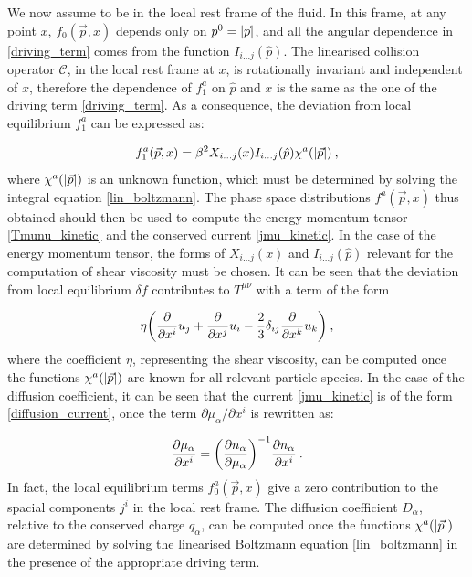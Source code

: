  We now assume to be in the local rest frame of the fluid. In this frame, at any point $x$, $f_0(\vec p,x)$ depends only on $p^0 = \abs{\vec p}$, and all the angular dependence in \ref{driving_term} comes from the function $I_{i \dots j}(\hat p)$. The linearised collision operator $\mathcal{C}$, in the local rest frame at $x$, is rotationally invariant and independent of $x$, therefore the dependence of $f_1^a$ on $\hat p$ and $x$ is the same as the one of the driving term \ref{driving_term}. As a consequence, the deviation from local equilibrium $f_1^a$ can be expressed as:
 
 \begin{equation}
 f_1^a (\vec p,x) = \beta^2 X_{i \dots j} (x) I_{i \dots j} (\hat p) \chi^a(\abs{\vec p}) \: ,
 \label{f1}
 \end{equation}
 where $\chi^a(\abs{\vec p})$ is an unknown function, which must be determined by solving the integral equation \ref{lin_boltzmann}. The phase space distributions $f^a(\vec p,x)$ thus obtained should then be used to compute the energy momentum tensor \ref{Tmunu_kinetic}  and the conserved current \ref{jmu_kinetic}. In the case of the energy momentum tensor, the forms of $X_{i \dots j}(x)$ and $I_{i \dots j}(\hat p)$ relevant for the computation of shear viscosity must be chosen. It can be seen that the deviation from local equilibrium $\delta f$ contributes to $T^{\mu\nu}$ with a term of the form
 
 \begin{equation}
 \eta \biggl( \frac{\partial  }{\partial x^i} u_j + \frac{\partial  }{\partial x^j} u_i -\frac{2}{3} \delta_{ij} \frac{\partial  }{\partial x^k} u_k \biggr) \: ,
 \end{equation} 
where the coefficient $\eta$, representing the shear viscosity, can be computed once the functions $\chi^a(\abs{\vec p})$ are known for all relevant particle species. In the case of the diffusion coefficient, it can be seen that the current \ref{jmu_kinetic} is of the form \ref{diffusion_current}, once the term $\partial \mu_{\alpha}/\partial x^i$ is rewritten as:

\begin{equation}
\frac{\partial \mu_{\alpha} }{\partial x^i}  = \biggl(\frac{\partial n_{\alpha}}{\partial  \mu_{\alpha}}\biggr)^{-1} \frac{\partial n_{\alpha} }{\partial x^i}  \: .
\end{equation}
%
In fact, the local equilibrium terms $f^a_0(\vec p,x)$ give a zero contribution to the spacial components $j^i$ in the local rest frame.
The diffusion coefficient $D_{\alpha}$, relative to the conserved charge $q_{\alpha}$, can be computed once the functions $\chi^a(\abs{\vec p})$ are determined by solving the linearised Boltzmann equation \ref{lin_boltzmann} in the presence of the appropriate driving term.

